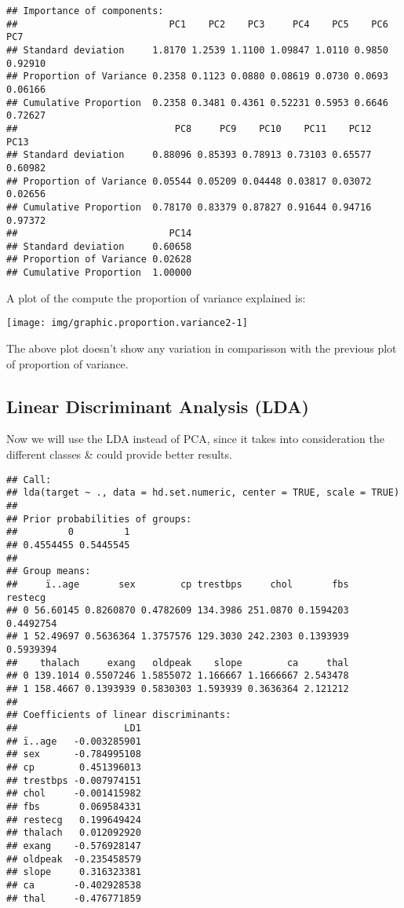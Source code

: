 \documentclass[]{article}
\begin{document}
\begin{verbatim}
## Importance of components:
##                           PC1    PC2    PC3     PC4    PC5    PC6     PC7
## Standard deviation     1.8170 1.2539 1.1100 1.09847 1.0110 0.9850 0.92910
## Proportion of Variance 0.2358 0.1123 0.0880 0.08619 0.0730 0.0693 0.06166
## Cumulative Proportion  0.2358 0.3481 0.4361 0.52231 0.5953 0.6646 0.72627
##                            PC8     PC9    PC10    PC11    PC12    PC13
## Standard deviation     0.88096 0.85393 0.78913 0.73103 0.65577 0.60982
## Proportion of Variance 0.05544 0.05209 0.04448 0.03817 0.03072 0.02656
## Cumulative Proportion  0.78170 0.83379 0.87827 0.91644 0.94716 0.97372
##                           PC14
## Standard deviation     0.60658
## Proportion of Variance 0.02628
## Cumulative Proportion  1.00000
\end{verbatim}

A plot of the compute the proportion of variance explained is:

\begin{center}\texttt{[image: img/graphic.proportion.variance2-1]} \end{center}

The above plot doesn't show any variation in comparisson with the
previous plot of proportion of variance.

\hypertarget{linear-discriminant-analysis-lda}{%
\subsection{Linear Discriminant Analysis
(LDA)}\label{linear-discriminant-analysis-lda}}

Now we will use the LDA instead of PCA, since it takes into
consideration the different classes \& could provide better results.

\begin{verbatim}
## Call:
## lda(target ~ ., data = hd.set.numeric, center = TRUE, scale = TRUE)
## 
## Prior probabilities of groups:
##         0         1 
## 0.4554455 0.5445545 
## 
## Group means:
##     ï..age       sex        cp trestbps     chol       fbs   restecg
## 0 56.60145 0.8260870 0.4782609 134.3986 251.0870 0.1594203 0.4492754
## 1 52.49697 0.5636364 1.3757576 129.3030 242.2303 0.1393939 0.5939394
##    thalach     exang   oldpeak    slope        ca     thal
## 0 139.1014 0.5507246 1.5855072 1.166667 1.1666667 2.543478
## 1 158.4667 0.1393939 0.5830303 1.593939 0.3636364 2.121212
## 
## Coefficients of linear discriminants:
##                   LD1
## ï..age   -0.003285901
## sex      -0.784995108
## cp        0.451396013
## trestbps -0.007974151
## chol     -0.001415982
## fbs       0.069584331
## restecg   0.199649424
## thalach   0.012092920
## exang    -0.576928147
## oldpeak  -0.235458579
## slope     0.316323381
## ca       -0.402928538
## thal     -0.476771859
\end{verbatim}
\end{document}
